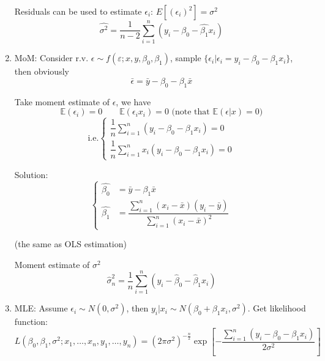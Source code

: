 \begin{enumerate}
        Residuals can be used to estimate $\epsilon_i$: $E[(\epsilon_i)^2]=\sigma^2$
        \begin{equation}\hat{\sigma^2}=\frac{1}{n-2}\sum_{i=1}^n(y_i-\hat{\beta_0}-\hat{\beta_1}x_i)\end{equation}

    \item MoM: Consider r.v. $\epsilon\sim f(\varepsilon;x,y,\beta_0,\beta_1)$, sample $\{\epsilon_i|\epsilon_i=y_i-\beta_0-\beta_1x_i\}$, then obviously
        \begin{equation}\bar{\epsilon}=\bar{y}-\beta_0-\beta_1\bar{x}\end{equation}

        Take moment estimate of $\epsilon$, we have 
        \begin{equation}\mathbb{E}(\epsilon_i)=0\qquad \mathbb{E}(\epsilon_i x_i)=0\text{ (note that }\mathbb{E}(\epsilon|x)=0)\end{equation}
        \begin{equation}\text{i.e.}\begin{cases}
            
            \dfrac{1}{n}\sum_{i=1}^n(y_i-\beta_0-\beta_1x_i)=0\\
            \dfrac{1}{n}\sum_{i=1}^nx_i(y_i-\beta_0-\beta_1x_i)=0
        \end{cases}\end{equation}

        Solution:
        \begin{equation}\begin{cases}
            \hat{\beta_0}&=\bar{y}-\beta_1\bar{x}\\
            \hat{\beta_1}&=\dfrac{\sum_{i=1}^n(x_i-\bar{x})(y_i-\bar{y})}{\sum_{i=1}^n(x_i-\bar{x})^2}
        \end{cases}\end{equation}

        (the same as OLS estimation)

        Moment estimate of $\sigma^2$
        \begin{equation}\hat{\sigma}^2_n=\frac{1}{n}\sum_{i=1}^n(y_i-\hat{\beta}_0-\hat{\beta}_1x_i)\end{equation}

    \item MLE: Assume $\epsilon_i\sim N(0,\sigma^2)$, then $y_i|x_i\sim N(\beta_0+\beta_1x_i,\sigma^2)$. Get likelihood function:
        \begin{equation}
            L(\beta_0,\beta_1,\sigma^2;x_1,\ldots,x_n,y_1,\ldots,y_n)=(2\pi\sigma^2)^{-\frac{n}{2}}\exp\left[-\frac{\sum_{i=1}^n(y_i-\beta_0-\beta_1x_i)}{2\sigma^2}\right]  
        \end{equation}


\end{enumerate}
